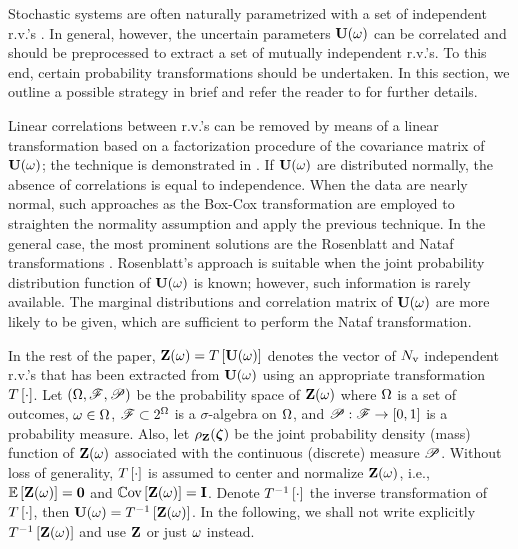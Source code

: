 Stochastic systems are often naturally parametrized with a set of independent r.v.'s \cite{xiu2009}. In general, however, the uncertain parameters $\mathbf{U}(\omega)$ can be correlated and should be preprocessed to extract a set of mutually independent r.v.'s. To this end, certain probability transformations should be undertaken. In this section, we outline a possible strategy in brief and refer the reader to \cite{eldred2009, xiu2009} for further details.

Linear correlations between r.v.'s can be removed by means of a linear transformation based on a factorization procedure of the covariance matrix of $\mathbf{U}(\omega)$; the technique is demonstrated in . If $\mathbf{U}(\omega)$ are distributed normally, the absence of correlations is equal to independence. When the data are nearly normal, such approaches as the Box-Cox transformation are employed to straighten the normality assumption and apply the previous technique. In the general case, the most prominent solutions are the Rosenblatt and Nataf transformations \cite{eldred2009}. Rosenblatt's approach is suitable when the joint probability distribution function of $\mathbf{U}(\omega)$ is known; however, such information is rarely available. The marginal distributions and correlation matrix of $\mathbf{U}(\omega)$ are more likely to be given, which are sufficient to perform the Nataf transformation.

In the rest of the paper, $\mathbf{Z}(\omega) = T\left[\mathbf{U}(\omega)\right]$ denotes the vector of ${N_\text{v}}$ independent r.v.'s that has been extracted from $\mathbf{U}(\omega)$ using an appropriate transformation $T\left[\cdot\right]$. Let $(\Omega, \mathscr{F}, \mathscr{P})$ be the probability space \cite{durrett2010} of $\mathbf{Z}(\omega)$ where $\Omega$ is a set of outcomes, $\omega \in \Omega$, $\mathscr{F} \subset 2^\Omega$ is a $\sigma$-algebra on $\Omega$, and $\mathscr{P}: \mathscr{F} \to [0, 1]$ is a probability measure. Also, let $\rho_{\mathbf{Z}}(\boldsymbol{\zeta})$ be the joint probability density (mass) function of $\mathbf{Z}(\omega)$ associated with the continuous (discrete) measure $\mathscr{P}$. Without loss of generality, $T\left[\cdot\right]$ is assumed to center and normalize $\mathbf{Z}(\omega)$, i.e., $\oExp{\vZ(\o)} = \mZero$ and $\oCov{\vZ(\o)} = \mI$. Denote $T^{-1}\left[\cdot\right]$ the inverse transformation of $T\left[\cdot\right]$, then $\mathbf{U}(\omega) = T^{-1}\left[\mathbf{Z}(\omega)\right]$. In the following, we shall not write explicitly $T^{-1}\left[\mathbf{Z}(\omega)\right]$ and use $\mathbf{Z}$ or just $\omega$ instead.
